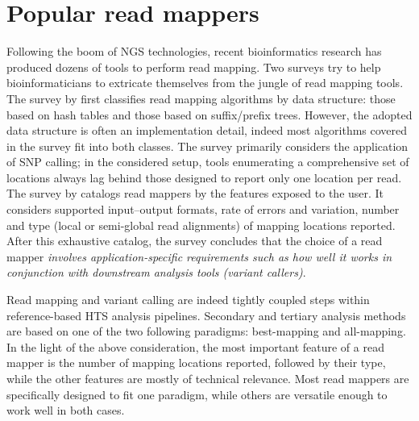 

\section{Popular read mappers}

Following the boom of NGS technologies, recent bioinformatics research has produced dozens of tools to perform read mapping.
Two surveys \citep{Li2010, Fonseca2012} try to help bioinformaticians to extricate themselves from the jungle of read mapping tools.
The survey by \citeauthor{Li2010} first classifies read mapping algorithms by data structure: those based on hash tables and those based on suffix/prefix trees.
However, the adopted data structure is often an implementation detail, indeed most algorithms covered in the survey fit into both classes.
The survey primarily considers the application of SNP calling; in the considered setup, tools enumerating a comprehensive set of locations always lag behind those designed to report only one location per read.
The survey by \citeauthor{Fonseca2012} catalogs read mappers by the features exposed to the user.
It considers supported input--output formats, rate of errors and variation, number and type (\ie local or semi-global read alignments) of mapping locations reported.
After this exhaustive catalog, the survey concludes that the choice of a read mapper 
\emph{involves application-specific requirements such as how well it works in conjunction with downstream analysis tools (\ie variant callers)}.

Read mapping and variant calling are indeed tightly coupled steps within reference-based HTS analysis pipelines.
Secondary and tertiary analysis methods are based on one of the two following paradigms: best-mapping and all-mapping.
In the light of the above consideration, the most important feature of a read mapper is the number of mapping locations reported, followed by their type, while the other features are mostly of technical relevance.
Most read mappers are specifically designed to fit one paradigm, while others are versatile enough to work well in both cases.

